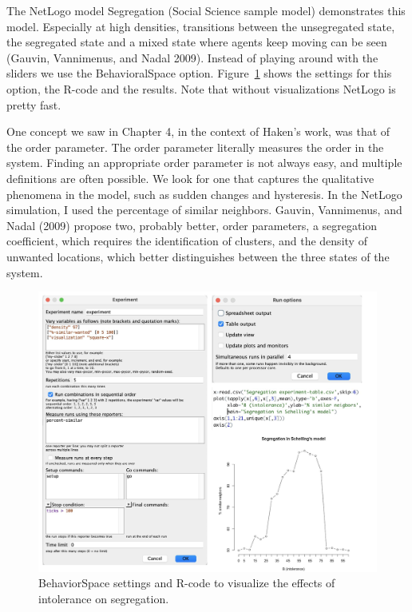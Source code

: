 \documentclass[
  letterpaper,
]{scrbook}
\begin{document}
The NetLogo model Segregation (Social Science sample model) demonstrates
this model. Especially at high densities, transitions between the
unsegregated state, the segregated state and a mixed state where agents
keep moving can be seen (Gauvin, Vannimenus, and Nadal 2009). Instead of
playing around with the sliders we use the BehavioralSpace option.
Figure~\ref{fig-ch7-img1-old-89} shows the settings for this option, the
R-code and the results. Note that without visualizations NetLogo is
pretty fast.

One concept we saw in Chapter 4, in the context of Haken's work, was
that of the order parameter. The order parameter literally measures the
order in the system. Finding an appropriate order parameter is not
always easy, and multiple definitions are often possible. We look for
one that captures the qualitative phenomena in the model, such as sudden
changes and hysteresis. In the NetLogo simulation, I used the percentage
of similar neighbors. Gauvin, Vannimenus, and Nadal (2009) propose two,
probably better, order parameters, a segregation coefficient, which
requires the identification of clusters, and the density of unwanted
locations, which better distinguishes between the three states of the
system.

\begin{figure}

{\centering \includegraphics[width=4.71786in,height=\textheight]{media/ch7/image1.jpg}

}

\caption{\label{fig-ch7-img1-old-89}BehaviorSpace settings and R-code to
visualize the effects of intolerance on segregation.}

\end{figure}
\end{document}
